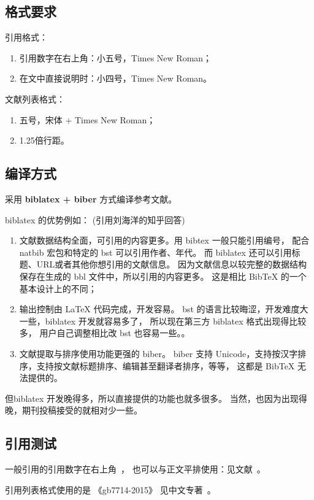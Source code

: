 \subsection{格式要求}

引用格式：

\begin{enumerate}
	\item 引用数字在右上角：小五号，Times New Roman；
	\item 在文中直接说明时：小四号，Times New Roman。
\end{enumerate}

文献列表格式：

\begin{enumerate}
	\item 五号，宋体 + Times New Roman；
	\item 1.25倍行距。
\end{enumerate}

\subsection{编译方式}

采用 \textbf{biblatex + biber} 方式编译参考文献。

biblatex 的优势例如： (引用刘海洋的知乎回答)

\begin{enumerate}
	\item 文献数据结构全面，可引用的内容更多。用 bibtex 一般只能引用编号，
	      配合 natbib 宏包和特定的 bst 可以引用作者、年代。
	      而 biblatex 还可以引用标题、URL或者其他你想引用的文献信息。
	      因为文献信息以较完整的数据结构保存在生成的 bbl 文件中，所以引用的内容更多。
	      这是相比 BibTeX 的一个基本设计上的不同；
	\item 输出控制由 LaTeX 代码完成，开发容易。
	      bst 的语言比较晦涩，开发难度大一些，biblatex 开发就容易多了，
	      所以现在第三方 biblatex 格式出现得比较多，
	      用户自己调整相比改 bst 也容易一些。。
	\item 文献提取与排序使用功能更强的 biber。
	      biber 支持 Unicode，支持按汉字排序，支持按文献标题排序、编辑甚至翻译者排序，等等，
	      这都是 BibTeX 无法提供的。
\end{enumerate}

但biblatex 开发晚得多，所以直接提供的功能也就多很多。
当然，也因为出现得晚，期刊投稿接受的就相对少一些。

\subsection{引用测试}

一般引用的引用数字在右上角~\cite{knuth1984}，
也可以与正文平排使用：见文献~\parencite{knuth1986}。

引用列表格式使用的是 《gb7714-2015》
见中文专著~\cite{liu2013}。
